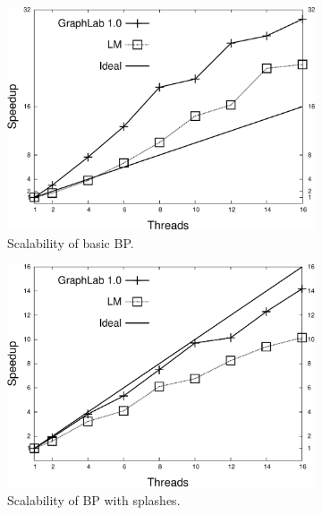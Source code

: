 \begin{figure}[ht]
   \centering
   \begin{subfigure}[b]{0.3\textwidth}
      \includegraphics[width=\textwidth]{new-benchmarks/speedup_bp-graphlab-400.pdf}
      \caption{Scalability of basic BP.\newline}
   \end{subfigure}
   \begin{subfigure}[b]{0.3\textwidth}
      \includegraphics[width=\textwidth]{new-benchmarks/speedup2_bp-graphlab-400.pdf}
      \caption{Scalability of BP with splashes.\newline}
   \end{subfigure}
   \begin{subfigure}[b]{0.3\textwidth}

\end{subfigure}
\end{figure}
